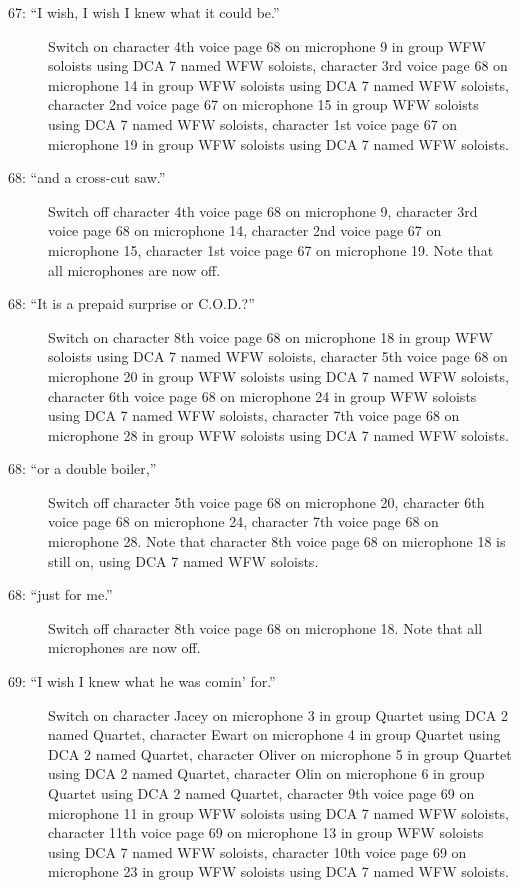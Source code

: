 \begin{description}
\item[67: ``I wish, I wish I knew what it could be.'']
Switch on character 4th voice page 68 on microphone 9 in group WFW soloists using DCA 7 named WFW soloists, character 3rd voice page 68 on microphone 14 in group WFW soloists using DCA 7 named WFW soloists, character 2nd voice page 67 on microphone 15 in group WFW soloists using DCA 7 named WFW soloists, character 1st voice page 67 on microphone 19 in group WFW soloists using DCA 7 named WFW soloists. 

\item[68: ``and a cross-cut saw.'']
Switch off character 4th voice page 68 on microphone 9, character 3rd voice page 68 on microphone 14, character 2nd voice page 67 on microphone 15, character 1st voice page 67 on microphone 19. Note that all microphones are now off.

\item[68: ``It is a prepaid surprise or C.O.D.?'']
Switch on character 8th voice page 68 on microphone 18 in group WFW soloists using DCA 7 named WFW soloists, character 5th voice page 68 on microphone 20 in group WFW soloists using DCA 7 named WFW soloists, character 6th voice page 68 on microphone 24 in group WFW soloists using DCA 7 named WFW soloists, character 7th voice page 68 on microphone 28 in group WFW soloists using DCA 7 named WFW soloists. 

\item[68: ``or a double boiler,'']
Switch off character 5th voice page 68 on microphone 20, character 6th voice page 68 on microphone 24, character 7th voice page 68 on microphone 28. Note that character 8th voice page 68 on microphone 18 is still on, using DCA 7 named WFW soloists.

\item[68: ``just for me.'']
Switch off character 8th voice page 68 on microphone 18. Note that all microphones are now off.

\item[69: ``I wish I knew what he was comin' for.'']
Switch on character Jacey on microphone 3 in group Quartet using DCA 2 named Quartet, character Ewart on microphone 4 in group Quartet using DCA 2 named Quartet, character Oliver on microphone 5 in group Quartet using DCA 2 named Quartet, character Olin on microphone 6 in group Quartet using DCA 2 named Quartet, character 9th voice page 69 on microphone 11 in group WFW soloists using DCA 7 named WFW soloists, character 11th voice page 69 on microphone 13 in group WFW soloists using DCA 7 named WFW soloists, character 10th voice page 69 on microphone 23 in group WFW soloists using DCA 7 named WFW soloists. 


\end{description}
